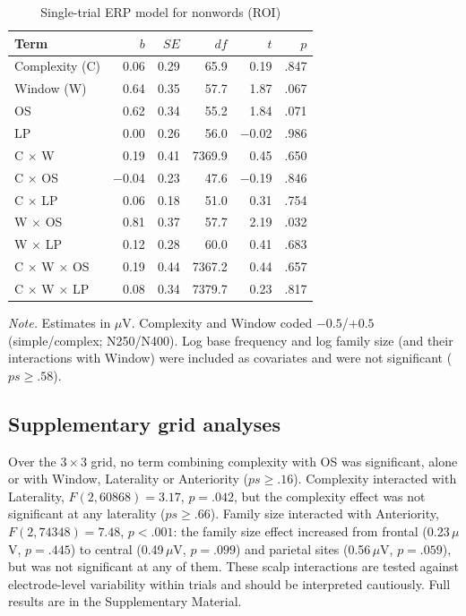 \begin{table}[htbp]
\centering
\caption{Single-trial ERP model for nonwords (ROI)}
\label{tab:nonwords}
\begin{tabular}{lrrrrr}
\toprule
Term & $b$ & $SE$ & $df$ & $t$ & $p$ \\
\midrule
Complexity (C)                    &  0.06 & 0.29 &   65.9 &  0.19 & .847 \\
Window (W)                        &  0.64 & 0.35 &   57.7 &  1.87 & .067 \\
OS                                &  0.62 & 0.34 &   55.2 &  1.84 & .071 \\
LP                                &  0.00 & 0.26 &   56.0 & $-$0.02 & .986 \\
C $\times$ W                      &  0.19 & 0.41 & 7369.9 &  0.45 & .650 \\
C $\times$ OS                     & $-$0.04 & 0.23 &   47.6 & $-$0.19 & .846 \\
C $\times$ LP                     &  0.06 & 0.18 &   51.0 &  0.31 & .754 \\
W $\times$ OS                     &  0.81 & 0.37 &   57.7 &  2.19 & .032 \\
W $\times$ LP                     &  0.12 & 0.28 &   60.0 &  0.41 & .683 \\
C $\times$ W $\times$ OS          &  0.19 & 0.44 & 7367.2 &  0.44 & .657 \\
C $\times$ W $\times$ LP          &  0.08 & 0.34 & 7379.7 &  0.23 & .817 \\
\bottomrule
\end{tabular}

\vspace{2pt}
\begin{minipage}{0.75\linewidth}\footnotesize
\textit{Note.} Estimates in $\mu$V. Complexity and Window coded $-0.5$/$+0.5$
(simple/complex; N250/N400). Log base frequency and log family size (and their
interactions with Window) were included as covariates and were not significant
($ps \geq .58$).
\end{minipage}
\end{table}

\subsection{Supplementary grid analyses}
Over the $3 \times 3$ grid, no term combining complexity with OS was significant,
alone or with Window, Laterality or Anteriority ($ps \geq .16$). Complexity
interacted with Laterality, $F(2, 60868) = 3.17$, $p = .042$, but the complexity
effect was not significant at any laterality ($ps \geq .66$). Family size
interacted with Anteriority, $F(2, 74348) = 7.48$, $p < .001$: the family size
effect increased from frontal (0.23\,$\mu$V, $p = .445$) to central
(0.49\,$\mu$V, $p = .099$) and parietal sites (0.56\,$\mu$V, $p = .059$), but
was not significant at any of them. These scalp interactions are tested against
electrode-level variability within trials and should be interpreted cautiously.
Full results are in the Supplementary Material.
